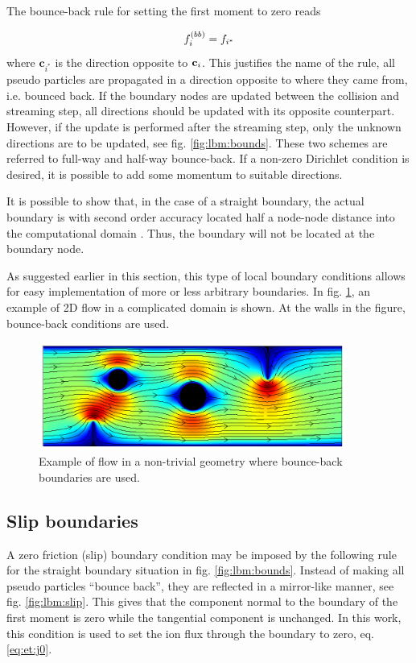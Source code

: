 The bounce-back rule for setting the first moment to zero reads

\begin{equation}
f_i^{(bb)} = f_{i^*}
\end{equation}
where $\mathbf{c}_{i^*}$ is the direction opposite to $\mathbf{c}_i$. This
justifies the name of the rule, all pseudo particles are propagated in
a direction opposite to where they came from, i.e. bounced back. If
the boundary nodes are updated between the collision and streaming
step, all directions should be updated with its opposite
counterpart. However, if the update is performed after the streaming
step, only the unknown directions are to be updated, see
fig. \ref{fig:lbm:bounds}. These two schemes are referred to full-way
and half-way bounce-back. If a non-zero Dirichlet condition is
desired, it is possible to add some momentum to suitable directions.

It is possible to show that, in the case of a straight boundary, the
actual boundary is with second order accuracy located half a node-node
distance into the computational domain \cite{junk-boundary}. Thus, the
boundary will not be located at the boundary node. 

As suggested earlier in this section, this type of local boundary
conditions allows for easy implementation of more or less arbitrary
boundaries. In fig. \ref{fig:lbm:cool_flow}, an example of 2D flow in a
complicated domain is shown. At the walls in the figure, bounce-back
conditions are used.

\begin{figure}
\begin{center}
\includegraphics[width=0.9\textwidth]{fig/comp_bound_u.pdf}
\end{center}
\caption{Example of flow in a non-trivial geometry where bounce-back
  boundaries are used.}
\label{fig:lbm:cool_flow}
\end{figure}

\subsection{Slip boundaries}\label{sec:lbm:mirror}
A zero friction (slip) boundary condition may be imposed by the
following rule for the straight boundary situation in
fig. \ref{fig:lbm:bounds}. Instead of making all pseudo particles
``bounce back'', they are reflected in a mirror-like manner, see
fig. \ref{fig:lbm:slip}. This gives that the component normal to the
boundary of the first moment is zero while the tangential component is
unchanged. In this work, this condition is used to set the
ion flux through the boundary to zero, eq. \eqref{eq:et:j0}.

